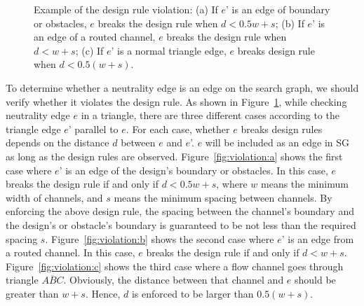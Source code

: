 \documentclass[journal]{IEEEtran}
\begin{document}
\begin{figure}[htbp]
{\begin{minipage}[b]{0.85\columnwidth}
		\end{minipage}%
	}%
	\caption{Example of the design rule violation: (a) If $e$' is an edge of boundary or obstacles, $e$ breaks the design rule when $d < 0.5w+s$; (b) If $e$' is an edge of a routed channel, $e$ breaks the design rule when $d < w+s$; (c) If $e$' is a normal triangle edge, $e$ breaks design rule when $d < 0.5(w+s)$. }
	\label{fig:violation}
\end{figure}


To determine whether a neutrality edge is an edge on the search graph, 
we should verify whether it violates the design rule. 
As shown in Figure~\ref{fig:violation}, while checking neutrality edge $e$ in a triangle, there are three different cases according to the triangle edge $e$' parallel to $e$. For each case, whether $e$ breaks design rules depends on the distance $d$ between $e$ and $e$'. $e$ will be included as an edge in SG as long as the design rules are observed. 
Figure~\ref{fig:violation:a} shows the first case where $e$' is an edge of the design's boundary or obstacles. In this case, $e$ breaks the design rule if and only if $d < 0.5w+s$, where $w$ means the minimum width of channels, and $s$ means the minimum spacing between channels. By enforcing the above design rule, the spacing between the channel's boundary and the design's or obstacle's boundary is guaranteed to be not less than the required spacing $s$. 
Figure~\ref{fig:violation:b} shows the second case where $e$' is an edge from a routed channel. In this case, $e$ breaks the design rule if and only if $d < w+s$. 
Figure~\ref{fig:violation:c} shows the third case where a flow channel goes through triangle $\overline{ABC}$. Obviously, the distance between that channel and $e$ should be greater than $w+s$. Hence, $d$ is enforced to be larger than $0.5(w+s)$. 
\end{document}
